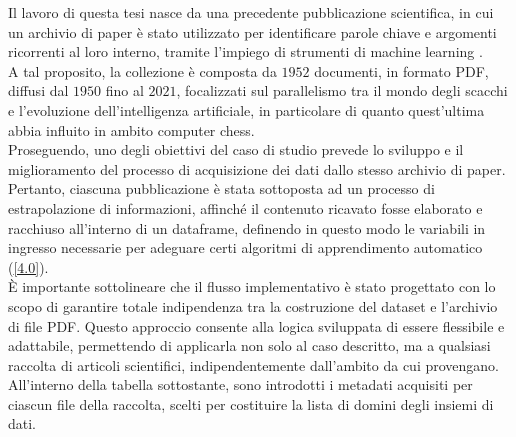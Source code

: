 Il lavoro di questa tesi nasce da una precedente pubblicazione scientifica, in cui un archivio di paper è stato utilizzato per identificare parole chiave e argomenti ricorrenti al loro interno, tramite l'impiego di strumenti di machine learning \cite{Borghesi_2024}. \vspace{7pt} \\
A tal proposito, la collezione è composta da $1952$ documenti, in formato PDF, diffusi dal $1950$ fino al $2021$, focalizzati sul parallelismo tra il mondo degli scacchi e l'evoluzione dell'intelligenza artificiale, in particolare di quanto quest'ultima abbia influito in ambito computer chess. \vspace{7pt} \\
Proseguendo, uno degli obiettivi del caso di studio prevede lo sviluppo e il miglioramento del processo di acquisizione dei dati dallo stesso archivio di paper. Pertanto, ciascuna pubblicazione è stata sottoposta ad un processo di estrapolazione di informazioni, affinché il contenuto ricavato fosse elaborato e racchiuso all'interno di un dataframe, definendo in questo modo le variabili in ingresso necessarie per adeguare certi algoritmi di apprendimento automatico (\ref{4.0}). \vspace{7pt} \\
È importante sottolineare che il flusso implementativo è stato progettato con lo scopo di garantire totale indipendenza tra la costruzione del dataset e l'archivio di file PDF. Questo approccio consente alla logica sviluppata di essere flessibile e adattabile, permettendo di applicarla non solo al caso descritto, ma a qualsiasi raccolta di articoli scientifici, indipendentemente dall'ambito da cui provengano. \vspace{7pt} \\
All'interno della tabella sottostante, sono introdotti i metadati acquisiti per ciascun file della raccolta, scelti per costituire la lista di domini degli insiemi di dati.

